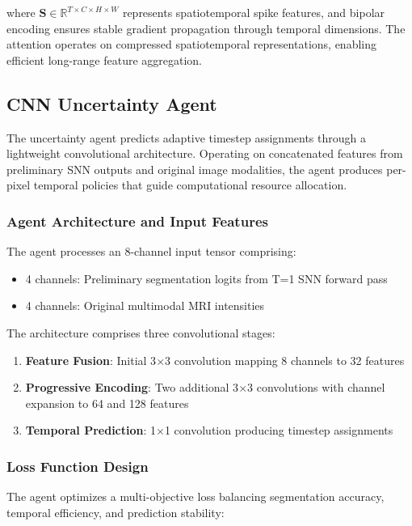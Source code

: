 \documentclass[12pt,a4paper]{article}
\begin{document}
where $\mathbf{S} \in \mathbb{R}^{T \times C \times H \times W}$ represents spatiotemporal spike features, and bipolar encoding ensures stable gradient propagation through temporal dimensions. The attention operates on compressed spatiotemporal representations, enabling efficient long-range feature aggregation.

\subsection{CNN Uncertainty Agent}

The uncertainty agent predicts adaptive timestep assignments through a lightweight convolutional architecture. Operating on concatenated features from preliminary SNN outputs and original image modalities, the agent produces per-pixel temporal policies that guide computational resource allocation.

\subsubsection{Agent Architecture and Input Features}

The agent processes an 8-channel input tensor comprising:
\begin{itemize}
\item 4 channels: Preliminary segmentation logits from T=1 SNN forward pass
\item 4 channels: Original multimodal MRI intensities
\end{itemize}

The architecture comprises three convolutional stages:
\begin{enumerate}
\item \textbf{Feature Fusion}: Initial 3$\times$3 convolution mapping 8 channels to 32 features
\item \textbf{Progressive Encoding}: Two additional 3$\times$3 convolutions with channel expansion to 64 and 128 features
\item \textbf{Temporal Prediction}: 1$\times$1 convolution producing timestep assignments
\end{enumerate}

\subsubsection{Loss Function Design}

The agent optimizes a multi-objective loss balancing segmentation accuracy, temporal efficiency, and prediction stability:
\end{document}
